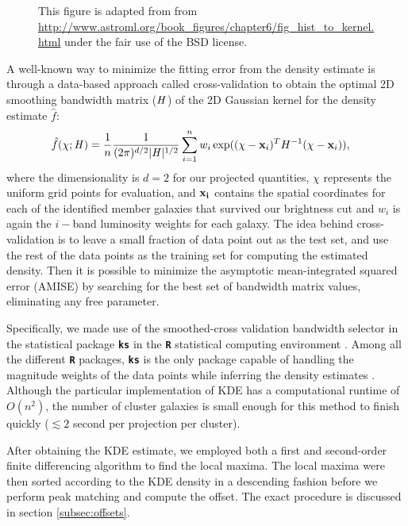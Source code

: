 \begin{figure*}
	\caption{This figure is adapted from \citealt{Vanderplas2012} from
\href{http://www.astroml.org/book\_figures/chapter6/fig\_hist\_to\_kernel.html}{http://www.astroml.org/book\_figures/chapter6/fig\_hist\_to\_kernel.html}
under the fair use of the BSD license. \label{fig:bias_variance_tradeoff} }
\end{figure*}
A well-known way to minimize the fitting error from the density estimate is through
a data-based approach called cross-validation to obtain 
the optimal 2D smoothing
bandwidth matrix ($\mathbf{\it H}$) of the 2D Gaussian kernel for the
density estimate $\hat{f}$:
\begin{align}
	\hat{f}(\chi; \mathbf{\it H}) &= \frac{1}{n} \frac{1}{(2\pi)^{d/2}|\mathbf{\it H}|^{1/2}}
	\sum_{i=1}^n w_i \exp((\chi-{\bf x}_i)^T H^{-1} (\chi-{\bf x}_i)),
	\label{eq:cross_validated_bandwidth}
\end{align}
where the dimensionality is $d=2$ for our projected quantities,
$\chi$ represents the uniform grid points for evaluation, and 
$\bf{x}_i$ contains the spatial coordinates for each of the identified member 
galaxies that survived our brightness cut and $w_i$ is again the $i-$band
luminosity weights for each galaxy.
The idea behind cross-validation is to leave a small fraction of data point 
out as the test set, and use the rest of the data points as 
the training set for computing the estimated density.
Then it is possible to minimize the asymptotic mean-integrated squared error
(AMISE)  by searching
for the best set of bandwidth matrix values, eliminating any free parameter. 

Specifically, we made use of the smoothed-cross validation \citep{Hall1992} 
bandwidth selector in the statistical package {\bf \texttt{ks}} \citep{Duong2007} 
in the {\bf \texttt{R}} statistical computing environment \citep{R_core}. 
Among all the different {\bf \texttt{R}} packages, {\bf \texttt{ks}} is the
only package capable of handling the magnitude weights of the data points 
while inferring the density estimates \citep{Deng2011}. 
Although the particular implementation of KDE has a computational runtime of $O(n^2)$, 
the number of cluster galaxies is
small enough for this method to finish quickly ($\lesssim 2$ second per
projection per cluster). 

After obtaining the KDE estimate, we employed both a first and second-order  
finite differencing algorithm to find the local maxima.  
The local maxima were then sorted according to the KDE density in a descending
fashion before we perform peak matching and compute the offset. The exact
procedure is discussed in section \ref{subsec:offsets}. 

